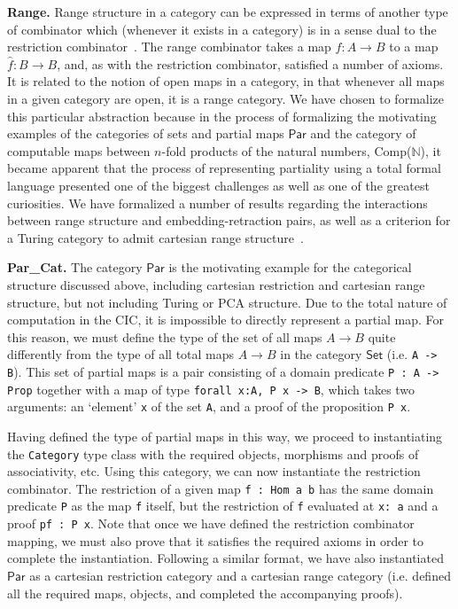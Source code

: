 \documentclass{entcs} \usepackage{entcsmacro}
\begin{document}
{\bfseries Range.} Range structure in a category can be expressed in terms of another type of combinator which (whenever it exists in a category) is in a sense dual to the restriction combinator~\cite{RangeI}. The range combinator takes a map $f : A \to B$ to a map $\hat{f} : B \to B$, and, as with the restriction combinator, satisfied a number of axioms. It is related to the notion of open maps in a category, in that whenever all maps in a given category are open, it is a range category. We have chosen to formalize this particular abstraction because in the process of formalizing the motivating examples of the categories of sets and partial maps $\mathsf{Par}$ and the category of computable maps between $n$-fold products of the natural numbers, Comp($\mathbb{N}$), it became apparent that the process of representing partiality using a total formal language presented one of the biggest challenges as well as one of the greatest curiosities. We have formalized a number of results regarding the interactions between range structure and embedding-retraction pairs, as well as a criterion for a Turing category to admit cartesian range structure~\cite{MyThesis}.

{\bfseries Par\_Cat.} The category $\mathsf{Par}$ is the motivating example for the categorical structure discussed above, including cartesian restriction and cartesian range structure, but not including Turing or PCA structure. Due to the total nature of computation in the CIC, it is impossible to directly represent a partial map. For this reason, we must define the type of the set of all maps $A \to B$ quite differently from the type of all total maps $A \to B$ in the category $\mathsf{Set}$ (i.e. {\tt \small A -> B}). This set of partial maps is a pair consisting of a domain predicate {\tt \small P : A -> Prop} together with a map of type {\tt \small forall x:A, P x -> B}, which takes two arguments: an `element' {\tt \small x} of the set {\tt \small A}, and a proof of the proposition {\tt \small P x}. 

Having defined the type of partial maps in this way, we proceed to instantiating the {\tt \small Category} type class with the required objects, morphisms and proofs of associativity, etc. Using this category, we can now instantiate the restriction combinator. The restriction of a given map {\tt \small f : Hom a b} has the same domain predicate {\tt \small P} as the map {\tt \small f} itself, but the restriction of {\tt \small f} evaluated at {\tt \small x: a} and a proof {\tt \small pf : P x}. Note that once we have defined the restriction combinator mapping, we must also prove that it satisfies the required axioms in order to complete the instantiation. Following a similar format, we have also instantiated $\mathsf{Par}$ as a cartesian restriction category and a cartesian range category (i.e. defined all the required maps, objects, and completed the accompanying proofs).
\end{document}
